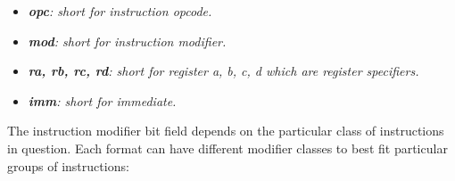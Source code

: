 \documentclass{article}
\begin{document}
            \begin{itemize}

                \item \textit{\textbf{opc}: short for instruction opcode.}
                \item \textit{\textbf{mod}: short for instruction modifier.}
                \item \textit{\textbf{ra, rb, rc, rd}: short for register a, b, c, d which are register specifiers.}
                \item \textit{\textbf{imm}: short for immediate.}

            \end{itemize}

            The instruction modifier bit field depends on the particular class of instructions in question. Each format can have different modifier classes to best fit particular groups of instructions:
\end{document}
